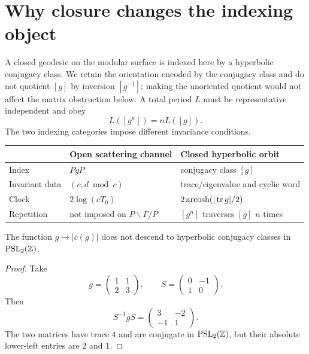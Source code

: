 \section{Why closure changes the indexing object}

A closed geodesic on the modular surface is indexed here by a hyperbolic
conjugacy class.  We retain the orientation encoded by the conjugacy class and
do not quotient $[g]$ by inversion $[g^{-1}]$; making the unoriented quotient
would not affect the matrix obstruction below.  A total period $L$ must be
representative independent and obey
\[
 L([g^n])=nL([g]).
\]
The two indexing categories impose different invariance conditions.

\begin{center}
\begin{tabular}{@{}lll@{}}
\toprule
 & Open scattering channel & Closed hyperbolic orbit \\
\midrule
Index & $PgP$ & conjugacy class $[g]$ \\
Invariant data & $(c,d\bmod c)$ & trace/eigenvalue and cyclic word \\
Clock & $2\log(cT_0)$ & $2\operatorname{arcosh}(|\operatorname{tr} g|/2)$ \\
Repetition & not imposed on $P\backslash\Gamma/P$ & $[g^n]$ traverses $[g]$ $n$ times \\
\bottomrule
\end{tabular}
\end{center}

\begin{proposition}\label{prop:conjugacy}
The function $g\mapsto|c(g)|$ does not descend to hyperbolic conjugacy
classes in $\operatorname{PSL}_2(\mathbb Z)$.
\end{proposition}

\begin{proof}
Take
\[
 g=\begin{pmatrix}1&1\\2&3\end{pmatrix},\qquad
 S=\begin{pmatrix}0&-1\\1&0\end{pmatrix}.
\]
Then
\[
 S^{-1}gS=\begin{pmatrix}3&-2\\-1&1\end{pmatrix}.
\]
The two matrices have trace $4$ and are conjugate in $\operatorname{PSL}_2(\mathbb Z)$, but their
absolute lower-left entries are $2$ and $1$.
\end{proof}

